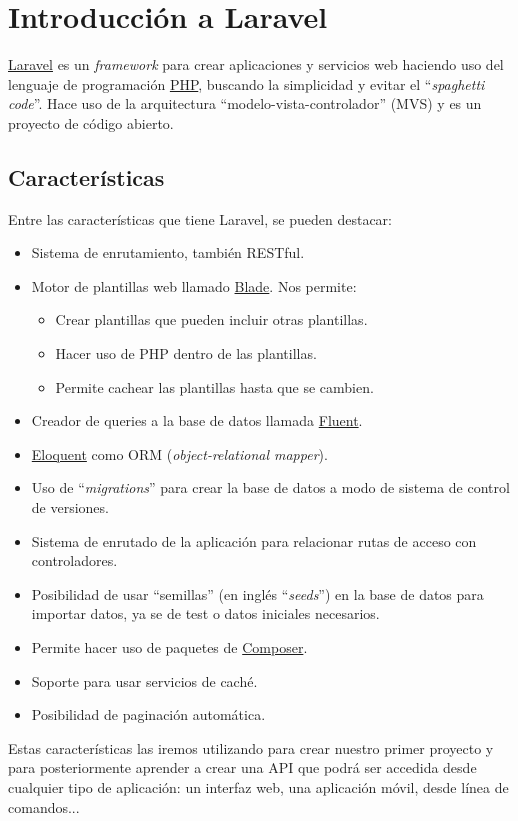 \chapter{Introducción a Laravel}

\href{https://laravel.com/}{Laravel} es un \textit{framework} para crear aplicaciones y servicios web haciendo uso del lenguaje de programación \href{https://es.wikipedia.org/wiki/PHP}{PHP}, buscando la simplicidad y evitar el “\textit{spaghetti code}”. Hace uso de la arquitectura “modelo-vista-controlador” (MVS) y es un proyecto de código abierto.

\section{Características}
Entre las características que tiene Laravel, se pueden destacar:

\begin{itemize}
    \item Sistema de enrutamiento, también RESTful.
    \item Motor de plantillas web llamado \href{https://laravel.com/docs/10.x/blade}{Blade}. Nos permite:
    \begin{itemize}
        \item Crear plantillas que pueden incluir otras plantillas.
        \item Hacer uso de PHP dentro de las plantillas.
        \item Permite cachear las plantillas hasta que se cambien.
    \end{itemize}
    \item Creador de queries a la base de datos llamada \href{https://laravel.com/docs/10.x/queries}{Fluent}.
    \item \href{https://laravel.com/docs/10.x/eloquent}{Eloquent} como ORM (\textit{object-relational mapper}).
    \item Uso de “\textit{migrations}” para crear la base de datos a modo de sistema de control de versiones.
    \item Sistema de enrutado de la aplicación para relacionar rutas de acceso con controladores.
    \item Posibilidad de usar “semillas” (en inglés “\textit{seeds}”) en la base de datos para importar datos, ya se de test o datos iniciales necesarios.
    \item Permite hacer uso de paquetes de \href{https://getcomposer.org/}{Composer}.
    \item Soporte para usar servicios de caché.
    \item Posibilidad de paginación automática.
\end{itemize}

Estas características las iremos utilizando para crear nuestro primer proyecto y para posteriormente aprender a crear una API que podrá ser accedida desde cualquier tipo de aplicación: un interfaz web, una aplicación móvil, desde línea de comandos...